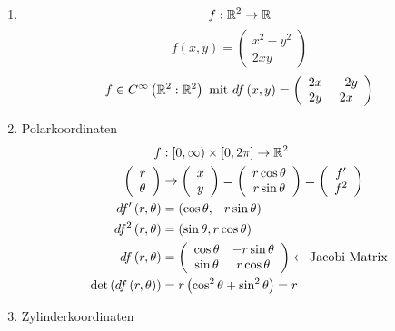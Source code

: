 \begin{enumerate}
\item \[f:\mathbb{R}^2\to\mathbb{R}\]
\[f\left( {x,y} \right) = \left( {\begin{array}{*{20}{c}}
{{x^2} - {y^2}}\\
{2xy}
\end{array}} \right)\]
\[f\in C^\infty\left( \R^2:\R^2\right) \text{ mit } df\left( {x,y} \right) = \left( {\begin{array}{*{20}{c}}
{2x}&{ - 2y}\\
{2y}&{2x}
\end{array}} \right) \]
\item Polarkoordinaten
\begin{align*}
f&:\lbrack 0,\infty)\times\lbrack 0,2\pi\rbrack\to\R^2\\
\left( {\begin{array}{*{20}{c}}
r\\
\theta
\end{array}} \right) &\to \left( {\begin{array}{*{20}{c}}
x\\
y
\end{array}} \right) = \left( {\begin{array}{*{20}{c}}
{r\cos \theta }\\
{r\sin \theta }
\end{array}} \right) = \left( {\begin{array}{*{20}{c}}
{f'}\\
{{f^2}}
\end{array}} \right)\\
df'\left( r,\theta\right)&=\left( \cos\theta, -r\sin\theta\right)\\
df^2\left( r,\theta\right)&=\left( \sin\theta, r\cos\theta\right)\\
df\left( {r,\theta } \right) &= \left( {\begin{array}{*{20}{c}}
{\cos \theta }&{ - r\sin \theta }\\
{\sin \theta }&{r\cos \theta }
\end{array}} \right) \leftarrow {\text{Jacobi Matrix}}\\
\det\left( df\left( r,\theta\right)\right)&=r\left( \cos^2\theta + \sin^2\theta\right)=r
\end{align*}
\item Zylinderkoordinaten

\end{enumerate}

